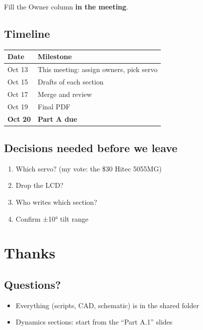 \documentclass[11pt]{article}
\begin{document}
Fill the Owner column \textbf{in the meeting}.
\subsection*{Timeline}
\label{sec:orgcbdca6d}
\begin{center}
\begin{tabular}{ll}
Date & Milestone\\
\hline
Oct 13 & This meeting: assign owners, pick servo\\
Oct 15 & Drafts of each section\\
Oct 17 & Merge and review\\
Oct 19 & Final PDF\\
\textbf{Oct 20} & \textbf{Part A due}\\
\end{tabular}
\end{center}
\subsection*{Decisions needed before we leave}
\label{sec:org39f160d}
\begin{enumerate}
\item Which servo? (my vote: the \$30 Hitec 5055MG)
\item Drop the LCD?
\item Who writes which section?
\item Confirm ±10° tilt range
\end{enumerate}
\section*{Thanks}
\label{sec:org5552837}
\subsection*{Questions?}
\label{sec:org629fd9b}
\begin{itemize}
\item Everything (scripts, CAD, schematic) is in the shared folder
\item Dynamics sections: start from the ``Part A.1'' slides
\end{itemize}
\end{document}
